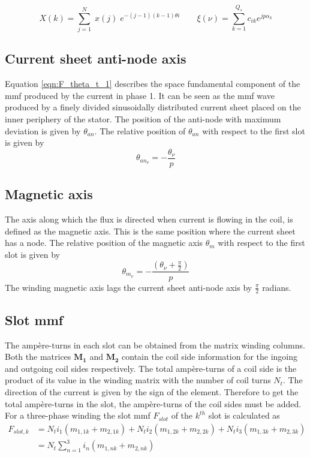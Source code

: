 \begin{equation}\label{eqn:dft}
  X(k) = \sum_{j=1}^N \; x(j) \; e^{-(j-1)(k-1)\theta i}
  \qquad
  \xi(\nu) = \sum_{k=1}^{Q_s}c_{ik}e^{jp\alpha_k}
\end{equation}

\subsection{Current sheet anti-node axis}\label{subsec:current_sheet}
Equation \eqref{eqn:F_theta_t_1} describes the space fundamental component of the mmf produced by the current in phase 1. It can be seen as the mmf wave produced by a finely divided sinusoidally distributed current sheet placed on the inner periphery of the stator. The position of the anti-node with maximum deviation is given by $\theta_{an}$. The relative position of $\theta_{an}$ with respect to the first slot is given by
\begin{equation}
  \label{eqn:theta_an}
  \theta_{an_{\nu}} = -
  \frac{\theta_{\nu}}{p}
\end{equation} 

\subsection{Magnetic axis}\label{subsec:magnetic_axis}
The axis along which the flux is directed when current is flowing in the coil, is defined as the magnetic axis. This is the same position where the current sheet has a node. The relative position of the magnetic axis $\theta_m$ with respect to the first slot is given by
\begin{equation}
  \label{eqn:theta_m}
  \theta_{m_{\nu}} = -
  \frac{\left(\theta_{\nu}+\frac{\pi}{2}\right)}{p}
\end{equation} 
The winding magnetic axis lags the current sheet anti-node axis by $\frac{\pi}{2}$
radians.

\subsection{Slot mmf}\label{subsec:slot_mmf}
The amp\`ere-turns in each slot can be obtained from the matrix winding columns. Both the matrices $\mathbf{M_1}$ and $\mathbf{M_2}$ contain the coil side information for the ingoing and outgoing coil sides respectively. The total amp\`ere-turns of a coil side is the product of its value in the winding matrix with the number of coil turns $N_t$. The direction of the current is given by the sign of the element. Therefore to get the total amp\`ere-turns in the slot, the amp\`ere-turns of the coil sides must be added. For a three-phase winding the slot mmf $F_{slot}$ of the $k^{th}$ slot is calculated as  
\begin{equation}
  \label{eqn:slot_mmf}
  \begin{aligned}
  F_{slot,k} &= N_t i_1(m_{1,1k}+m_{2,1k})+
                N_t i_2(m_{1,2k}+m_{2,2k})+
                N_t i_3(m_{1,3k}+m_{2,3k}) \\
             &= N_t\sum_{n=1}^{3}i_n \left(m_{1,nk}+m_{2,nk}\right) 
  \end{aligned}
\end{equation}

